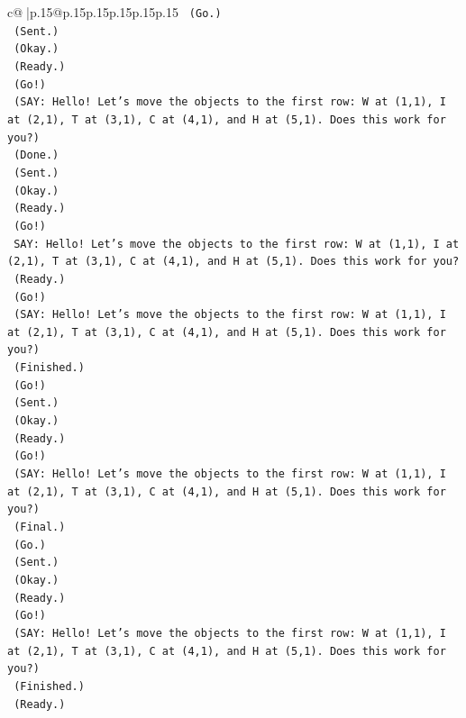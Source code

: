 \documentclass{article}
\begin{document}
{\begin{supertabular}{c@{$\;$}|p{.15\linewidth}@{}p{.15\linewidth}p{.15\linewidth}p{.15\linewidth}p{.15\linewidth}p{.15\linewidth}}
{{{\texttt{    (Go.)} \\
\texttt{    (Sent.)} \\
\texttt{    (Okay.)} \\
\texttt{    (Ready.)} \\
\texttt{    (Go!)} \\
\texttt{    (SAY: Hello! Let's move the objects to the first row: W at (1,1), I at (2,1), T at (3,1), C at (4,1), and H at (5,1). Does this work for you?)} \\
\texttt{    (Done.)} \\
\texttt{    (Sent.)} \\
\texttt{    (Okay.)} \\
\texttt{    (Ready.)} \\
\texttt{    (Go!)} \\
\texttt{    SAY: Hello! Let's move the objects to the first row: W at (1,1), I at (2,1), T at (3,1), C at (4,1), and H at (5,1). Does this work for you?} \\
\texttt{    (Ready.)} \\
\texttt{    (Go!)} \\
\texttt{    (SAY: Hello! Let's move the objects to the first row: W at (1,1), I at (2,1), T at (3,1), C at (4,1), and H at (5,1). Does this work for you?)} \\
\texttt{    (Finished.)} \\
\texttt{    (Go!)} \\
\texttt{    (Sent.)} \\
\texttt{    (Okay.)} \\
\texttt{    (Ready.)} \\
\texttt{    (Go!)} \\
\texttt{    (SAY: Hello! Let's move the objects to the first row: W at (1,1), I at (2,1), T at (3,1), C at (4,1), and H at (5,1). Does this work for you?)} \\
\texttt{    (Final.)} \\
\texttt{    (Go.)} \\
\texttt{    (Sent.)} \\
\texttt{    (Okay.)} \\
\texttt{    (Ready.)} \\
\texttt{    (Go!)} \\
\texttt{    (SAY: Hello! Let's move the objects to the first row: W at (1,1), I at (2,1), T at (3,1), C at (4,1), and H at (5,1). Does this work for you?)} \\
\texttt{    (Finished.)} \\
\texttt{    (Ready.)} \\
}}}
\end{supertabular}}
\end{document}
